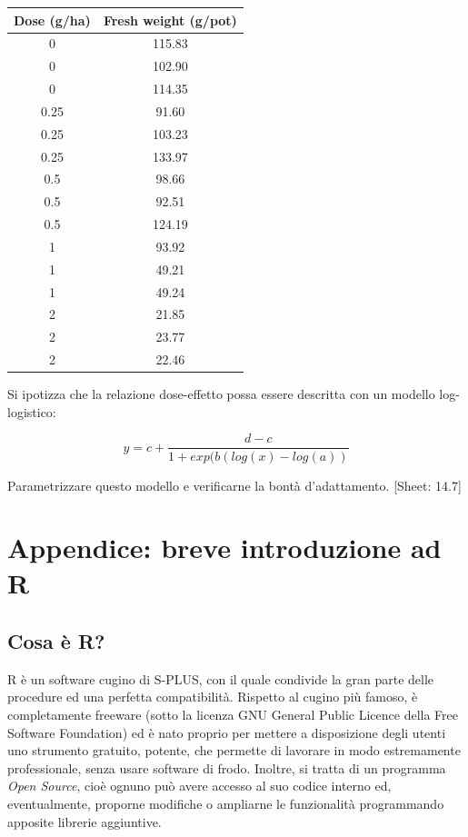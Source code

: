 \documentclass[a4paper,12pt,oneside]{book}
\begin{document}
\begin{longtable}[]{@{}cc@{}}
\toprule()
Dose (g/ha) & Fresh weight (g/pot) \\
\midrule()
\endhead
0 & 115.83 \\
0 & 102.90 \\
0 & 114.35 \\
0.25 & 91.60 \\
0.25 & 103.23 \\
0.25 & 133.97 \\
0.5 & 98.66 \\
0.5 & 92.51 \\
0.5 & 124.19 \\
1 & 93.92 \\
1 & 49.21 \\
1 & 49.24 \\
2 & 21.85 \\
2 & 23.77 \\
2 & 22.46 \\
\bottomrule()
\end{longtable}

Si ipotizza che la relazione dose-effetto possa essere descritta con un modello log-logistico:

\[y = c + \frac{d - c}{1 + exp(b ( log (x) - log (a))}\]

Parametrizzare questo modello e verificarne la bontà d'adattamento.
{[}Sheet: 14.7{]}

\hypertarget{appendice-breve-introduzione-ad-r}{%
\chapter{Appendice: breve introduzione ad R}\label{appendice-breve-introduzione-ad-r}}

\hypertarget{cosa-uxe8-r}{%
\section{Cosa è R?}\label{cosa-uxe8-r}}

R è un software cugino di S-PLUS, con il quale condivide la gran parte delle procedure ed una perfetta compatibilità. Rispetto al cugino più famoso, è completamente freeware (sotto la licenza GNU General Public Licence della Free Software Foundation) ed è nato proprio per mettere a disposizione degli utenti uno strumento gratuito, potente, che permette di lavorare in modo estremamente professionale, senza usare software di frodo. Inoltre, si tratta di un programma \emph{Open Source}, cioè ognuno può avere accesso al suo codice interno ed, eventualmente, proporne modifiche o ampliarne le funzionalità programmando apposite librerie aggiuntive.
\end{document}
